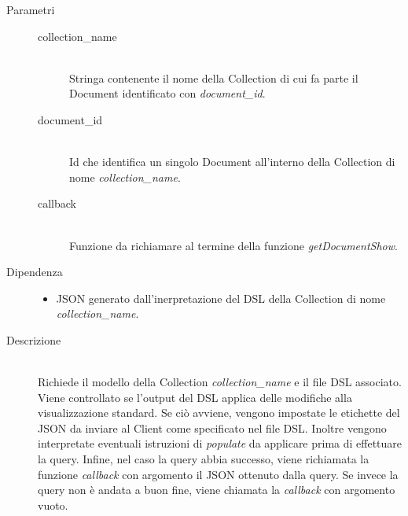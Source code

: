 \begin{description}
\begin{mldescription}
\begin{description}
		\end{description}
	
	 \hfill
		\begin{description}
			\item[Parametri] \hfill
				\begin{description}
					\item[collection\_name] \hfill \\
						Stringa contenente il nome della Collection di cui fa parte il Document identificato 							con \textit{document\_id}.
					\item[document\_id] \hfill \\
						Id che identifica un singolo Document all'interno della Collection di nome 									\textit{collection\_name}.
					\item[callback] \hfill \\
						Funzione da richiamare al termine della funzione \textit{getDocumentShow}.
				\end{description}
			\item[Dipendenza] \hfill
				\begin{itemize}
					\item JSON generato dall'inerpretazione del DSL della Collection di nome 										\textit{collection\_name}.
				\end{itemize}
			\item[Descrizione] \hfill \\
			Richiede il modello della Collection \textit{collection\_name} e il file DSL associato. Viene controllato se l'output del DSL applica delle modifiche alla visualizzazione standard. Se ciò avviene, vengono impostate le etichette del JSON da inviare al Client come specificato nel file DSL. Inoltre vengono interpretate eventuali istruzioni di \textit{populate} da applicare prima di effettuare la query. Infine, nel caso la query abbia successo, viene richiamata la funzione \textit{callback} con argomento il JSON ottenuto dalla query. Se invece la query non è andata a buon fine, viene chiamata la \textit{callback} con argomento vuoto.
		\end{description}
	

\end{mldescription}
\end{description}
